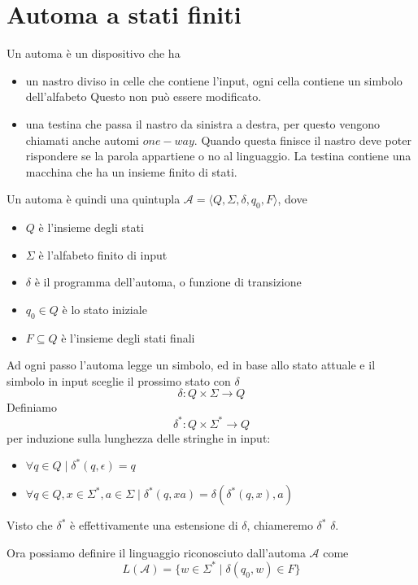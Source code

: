 \documentclass[12pt]{report}
\begin{document}
\section{Automa a stati finiti}
Un automa è un dispositivo che ha
\begin{itemize}
	\item un nastro diviso in celle che contiene l'input, ogni cella contiene un simbolo dell'alfabeto
		Questo non può essere modificato.
	\item una testina che passa il nastro da sinistra a destra, per questo vengono chiamati anche automi $one-way$.
		Quando questa finisce il nastro deve poter rispondere se la parola appartiene o no al linguaggio.
		La testina contiene una macchina che ha un insieme finito di stati.
\end{itemize}
Un automa è quindi una quintupla $\mathscr{A} = \langle Q, \Sigma, \delta, q_0, F \rangle$, dove
\begin{itemize}
	\item $Q$ è l'insieme degli stati
	\item $\Sigma$ è l'alfabeto finito di input
	\item $\delta$ è il programma dell'automa, o funzione di transizione
	\item $q_0 \in Q$ è lo stato iniziale
	\item $F \subseteq Q$ è l'insieme degli stati finali
\end{itemize}
Ad ogni passo l'automa legge un simbolo, ed in base allo stato attuale e il simbolo in input sceglie il prossimo stato con $\delta$
$$ \delta : Q \times \Sigma \rightarrow Q $$
Definiamo 
$$ \delta^* : Q \times \Sigma^* \rightarrow Q $$
per induzione sulla lunghezza delle stringhe in input:
\begin{itemize}
	\item $\forall q \in Q \mid \delta^*(q, \epsilon) = q $
	\item $\forall q \in Q, x \in \Sigma^*, a \in \Sigma \mid \delta^*(q, x a) = \delta(\delta^*(q, x), a)$
\end{itemize}
Visto che $\delta^*$ è effettivamente una estensione di $\delta$, chiameremo $\delta^*$ $\delta$.

Ora possiamo definire il linguaggio riconosciuto dall'automa $\mathscr{A}$ come
$$ L(\mathscr{A}) = \{ w \in \Sigma^* \mid \delta(q_0, w) \in F \} $$
\end{document}

